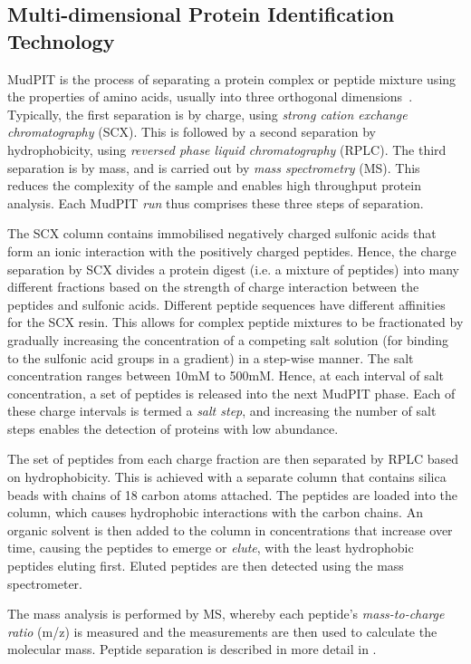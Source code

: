 \documentclass[11pt,a4paper]{article}
\begin{document}
\subsection{Multi-dimensional Protein Identification Technology} \label{subsec:MudPIT}
MudPIT is the process of separating a protein complex or peptide mixture using the properties of amino acids, usually into three orthogonal dimensions~\citep{Washburn2001}. Typically, the first separation is by charge, using \emph{strong cation exchange chromatography} (SCX). This is followed by a second separation by hydrophobicity, using \emph{reversed phase liquid chromatography} (RPLC). The third separation is by mass, and is carried out by \emph{mass spectrometry} (MS). This reduces the complexity of the sample and enables high throughput protein analysis. Each MudPIT \emph{run} thus comprises these three steps of separation.

The SCX column contains immobilised negatively charged sulfonic acids that form an ionic interaction with the positively charged peptides. Hence, the charge separation by SCX divides a protein digest (i.e. a mixture of peptides) into many different fractions based on the strength of charge interaction between the peptides and sulfonic acids. Different peptide sequences have different affinities for the SCX resin. This allows for complex peptide mixtures to be fractionated by gradually increasing the concentration of a competing salt solution (for binding to the sulfonic acid groups in a gradient) in a step-wise manner. The salt concentration ranges between 10mM to 500mM. Hence, at each interval of salt concentration, a set of peptides is released into the next MudPIT phase. Each of these charge intervals is termed a \emph{salt step}, and increasing the number of salt steps enables the detection of proteins with low abundance. 

The set of peptides from each charge fraction are then separated by RPLC based on hydrophobicity. This is achieved with a separate column that contains silica beads with chains of 18 carbon atoms attached. The peptides are loaded into the column, which causes hydrophobic interactions with the carbon chains. An organic solvent is then added to the column in concentrations that increase over time, causing the peptides to emerge or \emph{elute}, with the least hydrophobic peptides eluting first. Eluted peptides are then detected using the mass spectrometer.

The mass analysis is performed by MS, whereby each peptide's \emph{mass-to-charge ratio} (m/z) is measured and the measurements are then used to calculate the molecular mass. Peptide separation is described in more detail in \cite{Eidhammer2008}. 
\end{document}
